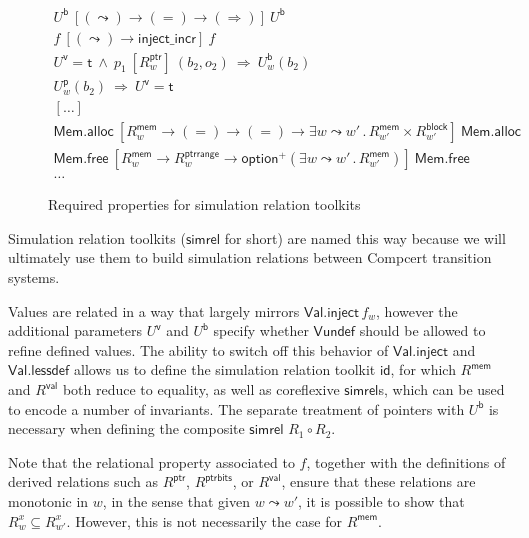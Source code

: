 \documentclass[acmsmall,anonymous,review]{acmart}
\newcommand{\kw}[1]{\ensuremath{ \textsf{#1} }}
\newcommand{\ifr}[1]{\ [#1]\ }
\begin{document}
\begin{figure}
  \begin{gather*}
    U^\kw{b} \ifr{(\leadsto) \rightarrow (=) \rightarrow (\Rightarrow)} U^\kw{b} \\
    f \ifr{(\leadsto) \rightarrow \kw{inject\_incr}} f \\
    U^\kw{v} = \kw{t} \ \wedge\  p_1 \ifr{R^\kw{ptr}_w} (b_2, o_2) \ \Rightarrow\  U^\kw{b}_w(b_2) \\
    U^\kw{p}_w(b_2) \ \Rightarrow\  U^\kw{v} = \kw{t} \\
    [\ldots] \\
    \kw{Mem.alloc}
    \ifr{R^\kw{mem}_w \rightarrow (=) \rightarrow (=) \rightarrow
      \exists w \leadsto w' \,.\, R^\kw{mem}_{w'} \times R^\kw{block}_{w'}}
    \kw{Mem.alloc}
    \\
    \kw{Mem.free}
    \ifr{R^\kw{mem}_w \rightarrow R^\kw{ptrrange}_w \rightarrow
      \kw{option}^+ (\exists w \leadsto w' \,.\, R^\kw{mem}_{w'})}
    \kw{Mem.free}
    \\
    \ldots
  \end{gather*}
  \label{fig:simrelprop}
  \caption{Required properties for simulation relation toolkits}
\end{figure}

Simulation relation toolkits (\kw{simrel} for short)
are named this way because we will ultimately
use them to build simulation relations between
Compcert transition systems.

Values are related in a way that largely mirrors $\kw{Val.inject}\,f_w$,
however the additional parameters $U^\kw{v}$ and $U^\kw{b}$
specify whether $\kw{Vundef}$ should be allowed to refine defined values.
The ability to switch off this behavior of \kw{Val.inject} and \kw{Val.lessdef}
allows us to define the simulation relation toolkit \kw{id},
for which $R^\kw{mem}$ and $R^\kw{val}$ both reduce to equality,
as well as coreflexive \kw{simrel}s,
which can be used to encode a number of invariants.
The separate treatment of pointers with $U^\kw{b}$
is necessary when defining the composite \kw{simrel} $R_1 \circ R_2$.

Note that the relational property associated to $f$,
together with the definitions of
derived relations such as $R^\kw{ptr}$, $R^\kw{ptrbits}$, or $R^\kw{val}$,
ensure that these relations are monotonic in $w$,
in the sense that given $w \leadsto w'$,
it is possible to show that $R^x_w \subseteq R^x_{w'}$.
However,
this is not necessarily the case for $R^\kw{mem}$.
\end{document}
